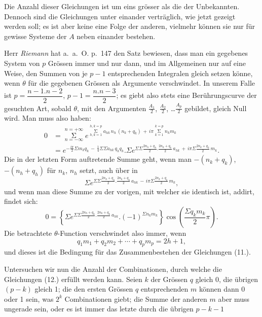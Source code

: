 \documentclass{article}
\begin{document}

Die Anzahl dieser Gleichungen ist um eins grösser als die der Unbekannten. Dennoch sind die Gleichungen unter einander verträglich, wie jetzt gezeigt werden soll; es ist aber keine eine Folge der anderen, vielmehr können sie nur für gewisse Systeme der $A$ neben einander bestehen.

Herr \emph{Riemann} hat a.\ a.\ O. p.\ 147 den Satz bewiesen, dass man ein gegebenes System von $p$ Grössen immer und nur dann, und im Allgemeinen nur auf eine Weise, den Summen von je $p-1$ entsprechenden Integralen gleich setzen könne, wenn $\theta$ für die gegebenen Grössen als Argumente verschwindet. In unserem Falle ist $p = \dfrac{n-1.n-2}{2}$, $p-1 = \dfrac{n.n-3}{2}$; es giebt also stets eine Berührungscurve der gesuchten Art, sobald $\theta$, mit den Argumenten $\frac{A_{1}}{2}$, $\frac{A_{2}}{2}$, \ldots $\frac{A_{p}}{2}$ gebildet, gleich Null wird. Man muss also haben:
\[
\begin{aligned}
0 &= \mathop{\Sigma}\limits_{n=-\infty}^{n=+\infty} e^{\mathop{\Sigma}\limits_{h,k=1}^{h,k=p} a_{hk}\,n_{h}\,(n_{k}+q_{k}) \,+\, i\pi \mathop{\Sigma}\limits_{k=1}^{k=p} n_{k}m_{k}}\\[2ex]
&= e^{-\frac{i\pi}{2}\Sigma m_{k}q_{k} \,-\, \frac{1}{4}\Sigma\Sigma a_{hk}\,q_{h}q_{k}}.\Sigma e^{\Sigma\Sigma \frac{2n_{h}+q_{h}}{2}.\frac{2n_{k}+q_{k}}{2}\,a_{hk} \,+\, i\pi\Sigma \frac{2n_{k}+q_{k}}{2}\,m_{k}}.
\end{aligned}
\]
Die in der letzten Form auftretende Summe geht, wenn man $-(n_{k}+q_{k})$, $-(n_{h}+q_{h})$ für $n_{k}$, $n_{h}$ setzt, auch über in
\[
\Sigma e^{\Sigma\Sigma \frac{2n_{h}+q_{h}}{2}.\frac{2n_{k}+q_{k}}{2}\,a_{hk} \,-\, i\pi \Sigma \frac{2n_{k}+q_{k}}{2}\,m_{k}},
\]
und wenn man diese Summe zu der vorigen, mit welcher sie identisch ist, addirt, findet sich:
\[
0 = \left\{ \Sigma e^{\Sigma\Sigma \frac{2n_{h}+q_{h}}{2}.\frac{2n_{k}+q_{k}}{2}\,a_{hk}}.(-1)^{\Sigma n_{k}m_{k}} \right\} \cos\left(\frac{\Sigma q_{k}m_{k}}{2}\pi\right).
\]
Die betrachtete $\theta$-Function verschwindet also immer, wenn
\[
q_{1}m_{1}+q_{2}m_{2}+\cdots+q_{p}m_{p} = 2h+1, \tag{12.}
\]
und dieses ist die Bedingung für das Zusammenbestehen der Gleichungen (11.).

Untersuchen wir nun die Anzahl der Combinationen, durch welche die Gleichungen (12.) erfüllt werden kann. Seien $k$ der Grössen $q$ gleich 0, die übrigen $(p-k)$ gleich 1; die den ersten Grössen $q$ entsprechenden $m$ können dann 0 oder 1 sein, was $2^{k}$ Combinationen giebt; die Summe der anderen $m$ aber muss ungerade sein, oder es ist immer das letzte durch die übrigen $p-k-1$
\end{document}
